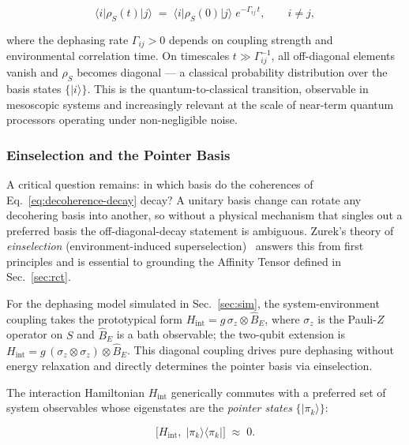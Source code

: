 \begin{equation}
\label{eq:decoherence-decay}
\langle i \vert \rho_S(t) \vert j \rangle
  \;=\;
  \langle i \vert \rho_S(0) \vert j \rangle\;
  e^{-\Gamma_{ij}\, t},
  \qquad i \neq j,
\end{equation}

\noindent
where the dephasing rate $\Gamma_{ij} > 0$ depends on coupling
strength and environmental correlation time.
On timescales $t \gg \Gamma_{ij}^{-1}$, all off-diagonal elements
vanish and $\rho_S$ becomes diagonal --- a classical probability
distribution over the basis states $\{\vert i\rangle\}$.
This is the quantum-to-classical transition, observable in mesoscopic
systems and increasingly relevant at the scale of near-term quantum
processors operating under non-negligible noise.

\subsubsection*{Einselection and the Pointer Basis}

A critical question remains: in which basis do the coherences of
Eq.~\eqref{eq:decoherence-decay} decay?
A unitary basis change can rotate any decohering basis into another, so
without a physical mechanism that singles out a preferred basis the
off-diagonal-decay statement is ambiguous.
Zurek's theory of \emph{einselection} (environment-induced
superselection)~\cite{Zurek2003} answers this from first principles
and is essential to grounding the Affinity Tensor defined in
Sec.~\ref{sec:rct}.

For the dephasing model simulated in Sec.~\ref{sec:sim}, the
system-environment coupling takes the prototypical form
$H_{\mathrm{int}} = g\,\sigma_z \otimes \hat{B}_E$,
where $\sigma_z$ is the Pauli-$Z$ operator on $S$ and
$\hat{B}_E$ is a bath observable; the two-qubit extension is
$H_{\mathrm{int}} = g\,(\sigma_z \otimes \sigma_z) \otimes \hat{B}_E$.
This diagonal coupling drives pure dephasing without energy relaxation
and directly determines the pointer basis via einselection.

The interaction Hamiltonian $H_{\mathrm{int}}$ generically commutes
with a preferred set of system observables whose eigenstates are
the \emph{pointer states} $\{\vert \pi_k \rangle\}$:

\begin{equation}
\label{eq:pointer}
\bigl[ H_{\mathrm{int}},\;
       \vert \pi_k \rangle\langle \pi_k \vert \bigr]
\;\approx\; 0.
\end{equation}

